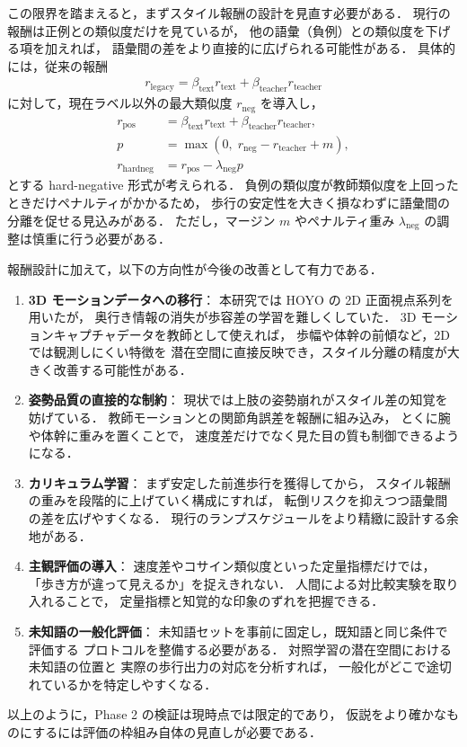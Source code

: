 この限界を踏まえると，まずスタイル報酬の設計を見直す必要がある．
現行の報酬は正例との類似度だけを見ているが，
他の語彙（負例）との類似度を下げる項を加えれば，
語彙間の差をより直接的に広げられる可能性がある．
具体的には，従来の報酬
\begin{align}
  r_{\mathrm{legacy}}
  = \beta_{\mathrm{text}}r_{\mathrm{text}}
  + \beta_{\mathrm{teacher}}r_{\mathrm{teacher}}
\end{align}
に対して，現在ラベル以外の最大類似度 \(r_{\mathrm{neg}}\) を導入し，
\begin{align}
  r_{\mathrm{pos}}
  &= \beta_{\mathrm{text}}r_{\mathrm{text}}
  + \beta_{\mathrm{teacher}}r_{\mathrm{teacher}}, \\
  p
  &= \max(0,\;r_{\mathrm{neg}}-r_{\mathrm{teacher}}+m), \\
  r_{\mathrm{hardneg}}
  &= r_{\mathrm{pos}}-\lambda_{\mathrm{neg}}p
\end{align}
とする hard-negative 形式が考えられる．
負例の類似度が教師類似度を上回ったときだけペナルティがかかるため，
歩行の安定性を大きく損なわずに語彙間の分離を促せる見込みがある．
ただし，マージン $m$ やペナルティ重み $\lambda_{\mathrm{neg}}$ の調整は慎重に行う必要がある．

報酬設計に加えて，以下の方向性が今後の改善として有力である．

\begin{enumerate}
  \item \textbf{3D モーションデータへの移行}：
        本研究では HOYO の 2D 正面視点系列を用いたが，
        奥行き情報の消失が歩容差の学習を難しくしていた．
        3D モーションキャプチャデータを教師として使えれば，
        歩幅や体幹の前傾など，2D では観測しにくい特徴を
        潜在空間に直接反映でき，スタイル分離の精度が大きく改善する可能性がある．
  \item \textbf{姿勢品質の直接的な制約}：
        現状では上肢の姿勢崩れがスタイル差の知覚を妨げている．
        教師モーションとの関節角誤差を報酬に組み込み，
        とくに腕や体幹に重みを置くことで，
        速度差だけでなく見た目の質も制御できるようになる．
  \item \textbf{カリキュラム学習}：
        まず安定した前進歩行を獲得してから，
        スタイル報酬の重みを段階的に上げていく構成にすれば，
        転倒リスクを抑えつつ語彙間の差を広げやすくなる．
        現行のランプスケジュールをより精緻に設計する余地がある．
  \item \textbf{主観評価の導入}：
        速度差やコサイン類似度といった定量指標だけでは，
        「歩き方が違って見えるか」を捉えきれない．
        人間による対比較実験を取り入れることで，
        定量指標と知覚的な印象のずれを把握できる．
  \item \textbf{未知語の一般化評価}：
        未知語セットを事前に固定し，既知語と同じ条件で評価する
        プロトコルを整備する必要がある．
        対照学習の潜在空間における未知語の位置と
        実際の歩行出力の対応を分析すれば，
        一般化がどこで途切れているかを特定しやすくなる．
\end{enumerate}

以上のように，Phase 2 の検証は現時点では限定的であり，
仮説をより確かなものにするには評価の枠組み自体の見直しが必要である．
